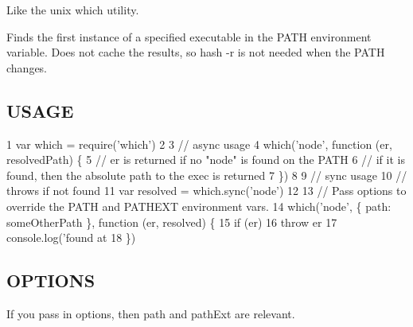 Like the unix {\ttfamily which} utility.

Finds the first instance of a specified executable in the P\+A\+T\+H environment variable. Does not cache the results, so {\ttfamily hash -\/r} is not needed when the P\+A\+T\+H changes.

\subsection*{U\+S\+A\+G\+E}


\begin{DoxyCode}
1 var which = require('which')
2 
3 // async usage
4 which('node', function (er, resolvedPath) \{
5   // er is returned if no "node" is found on the PATH
6   // if it is found, then the absolute path to the exec is returned
7 \})
8 
9 // sync usage
10 // throws if not found
11 var resolved = which.sync('node')
12 
13 // Pass options to override the PATH and PATHEXT environment vars.
14 which('node', \{ path: someOtherPath \}, function (er, resolved) \{
15   if (er)
16     throw er
17   console.log('found at %
18 \})
\end{DoxyCode}


\subsection*{O\+P\+T\+I\+O\+N\+S}

If you pass in options, then {\ttfamily path} and {\ttfamily path\+Ext} are relevant. 